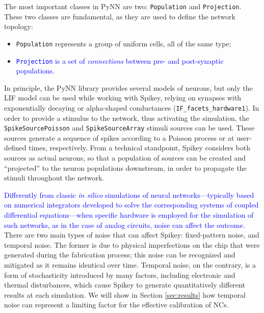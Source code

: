 \documentclass[utf8]{frontiersFPHY} %
\begin{document}
The most important classes in PyNN are two: \texttt{Population} and  \texttt{Projection}. 
These two classes are fundamental, as they are used to define the network topology:
\begin{itemize}
 	\item \texttt{Population} represents a group of uniform cells, all of the same type;
 	\item \textcolor{blue}{\texttt{Projection} is a set of \emph{connections} between pre- and post-synaptic populations.}
 \end{itemize} 
In principle, the PyNN library provides several models of neurons, but only the LIF model can be used while working with Spikey,
relying on synapses with exponentially decaying or alpha-shaped conductances (\texttt{IF\_facets\_hardware1}). 
In order to provide a stimulus to the network, thus activating the simulation, the \texttt{SpikeSourcePoisson} and \texttt{SpikeSourceArray} stimuli sources can
be used.
These sources generate a sequence of spikes according to a Poisson process or at user-defined times, respectively.
From a technical standpoint, Spikey considers both sources as actual neurons, so that a population of sources can be created and ``projected'' to the  neuron populations
downstream, in order to propagate the stimuli throughout the network.

\textcolor{blue}{Differently from classic \emph{in silico} simulations of neural networks---typically based on numerical integrators developed to solve the corresponding systems of coupled differential equations---when specific hardware is employed for the simulation of such networks, as in the case of analog circuits, noise can affect the outcome.}
There are two main types of noise that can affect Spikey: fixed-pattern noise, and temporal noise. 
The former is due to physical imperfections on the chip that were generated during the fabrication process; this noise can be recognized and mitigated as it remains identical over time. 
Temporal noise, on the contrary, is a form of stochasticity introduced by many factors, including electronic and thermal disturbances, which cause Spikey to generate quantitatively different results at each simulation. 
We will show in Section \ref{sec:results} how temporal noise can represent a limiting factor for the effective calibration of NCs.
\end{document}
